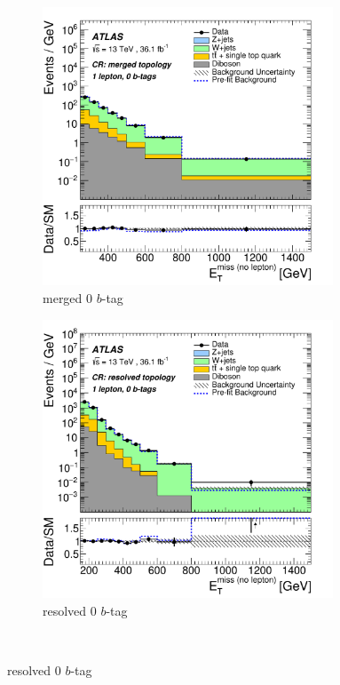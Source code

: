 \begin{figure}[htbp]
\centering
  \begin{subfigure}{0.45\textwidth}
    \centering
    \includegraphics[width=0.95\textwidth]{figures/monoV/results/figaux_08a.pdf}
    \caption{merged 0 \(b\)-tag}
  \end{subfigure}
    \begin{subfigure}{0.45\textwidth}
    \centering
    \includegraphics[width=0.95\textwidth]{figures/monoV/results/figaux_08b.pdf}
    \caption{resolved 0 \(b\)-tag}
  \end{subfigure} \\


\end{figure}
